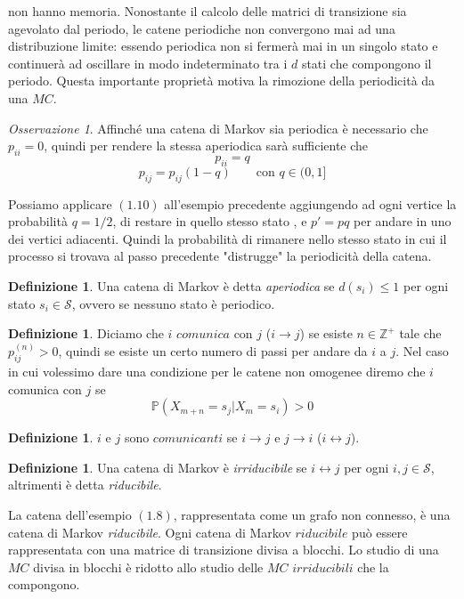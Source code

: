 \documentclass{article}
\theoremstyle{definition}
\theoremstyle{definition}
\newtheorem{definition}[theorem]{Definizione}
\theoremstyle{remark}
\newtheorem{remark}[theorem]{Osservazione}
\begin{document}
non hanno memoria.
Nonostante il calcolo delle matrici di transizione sia agevolato dal periodo, le catene periodiche non convergono mai
ad una distribuzione limite: essendo periodica non si fermerà mai in un singolo stato e continuerà ad oscillare
in modo indeterminato tra i $d$ stati  che compongono il periodo. Questa importante proprietà motiva la rimozione della
periodicità da una $MC$.
\begin{remark}
    Affinché una catena di Markov sia periodica è necessario che $p_{ii} = 0$, quindi per rendere la stessa aperiodica sarà sufficiente che
    $$p_{ii} = q$$
    $$p_{ij} = p_{ij}(1-q) \qquad \text{con $q\in(0,1]$}$$
\end{remark}
Possiamo applicare $(1.10)$ all'esempio precedente aggiungendo ad ogni vertice la probabilità $q=1/2$, di restare in quello stesso stato , e $p' = pq$ per andare in uno dei vertici adiacenti.
Quindi la probabilità di rimanere nello stesso stato in cui il processo si trovava al passo precedente "distrugge" la periodicità della catena.
\begin{definition}
    Una catena di Markov è detta \textit{aperiodica} se $d(s_i)\le 1$ per ogni stato $s_i\in\mathcal{S}$, ovvero se nessuno stato è periodico.
\end{definition}
\begin{definition}
    Diciamo che $i$ $comunica$ con $j$ ($i\to j$) se esiste $n\in \mathbb{Z}^+$ tale che $p^{(n)}_{ij}>0$, quindi se esiste un certo numero di passi
    per andare da $i$ a $j$. Nel caso in cui volessimo dare una condizione per le catene non omogenee diremo che $i$ comunica con $j$ se $$\mathbb{P}(X_{m+n}=s_j|X_{m} =s_i)>0$$
\end{definition}
\begin{definition}
    $i$ e $j$ sono $comunicanti$ se $i\to j$ e $j\to i$ ($i\longleftrightarrow j$).
\end{definition}
\begin{definition}
    Una catena di Markov è \textit{irriducibile} se $i\longleftrightarrow  j$ per ogni $i,j\in \mathcal{S}$, altrimenti è detta \textit{riducibile}.
\end{definition}
La catena dell'esempio $\mathbf{(1.8)}$, rappresentata come un grafo non connesso, è una catena di Markov \textit{riducibile}. Ogni catena di Markov $riducibile$
può essere rappresentata con una matrice di transizione divisa a blocchi. Lo studio di una $MC$ divisa in blocchi è ridotto allo studio delle $MC$ $irriducibili$ che la compongono.\\
\end{document}
